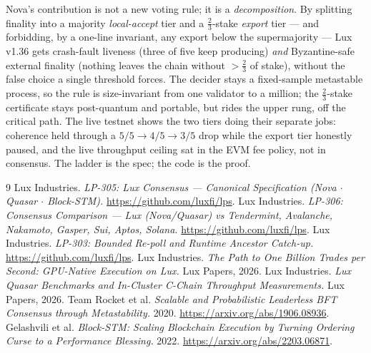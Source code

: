 \documentclass[11pt,a4paper]{article}
\begin{document}
Nova's contribution is not a new voting rule; it is a \emph{decomposition}. By splitting
finality into a majority \emph{local-accept} tier and a \(\tfrac{2}{3}\)-stake \emph{export}
tier --- and forbidding, by a one-line invariant, any export below the supermajority --- Lux
v1.36 gets crash-fault liveness (three of five keep producing) \emph{and} Byzantine-safe
external finality (nothing leaves the chain without \(>\tfrac{2}{3}\) of stake), without the
false choice a single threshold forces. The decider stays a fixed-sample metastable process,
so the rule is size-invariant from one validator to a million; the \(\tfrac{2}{3}\)-stake
certificate stays post-quantum and portable, but rides the upper rung, off the critical path.
The live testnet shows the two tiers doing their separate jobs: coherence held through a
\(5/5\to4/5\to3/5\) drop while the export tier honestly paused, and the live throughput ceiling
sat in the EVM fee policy, not in consensus. The ladder is the spec; the code is the proof.

\begin{thebibliography}{9}
 Lux Industries. \emph{LP-305: Lux Consensus --- Canonical Specification (Nova
\(\cdot\) Quasar \(\cdot\) Block-STM).} \url{https://github.com/luxfi/lps}.
 Lux Industries. \emph{LP-306: Consensus Comparison --- Lux (Nova/Quasar) vs
Tendermint, Avalanche, Nakamoto, Gasper, Sui, Aptos, Solana.}
\url{https://github.com/luxfi/lps}.
 Lux Industries. \emph{LP-303: Bounded Re-poll and Runtime Ancestor Catch-up.}
\url{https://github.com/luxfi/lps}.
 Lux Industries. \emph{The Path to One Billion Trades per Second: GPU-Native
Execution on Lux.} Lux Papers, 2026.
 Lux Industries. \emph{Lux Quasar Benchmarks and In-Cluster C-Chain
Throughput Measurements.} Lux Papers, 2026.
 Team Rocket et al. \emph{Scalable and Probabilistic Leaderless BFT
Consensus through Metastability.} 2020. \url{https://arxiv.org/abs/1906.08936}.
 Gelashvili et al. \emph{Block-STM: Scaling Blockchain Execution by
Turning Ordering Curse to a Performance Blessing.} 2022. \url{https://arxiv.org/abs/2203.06871}.
\end{thebibliography}
\end{document}
